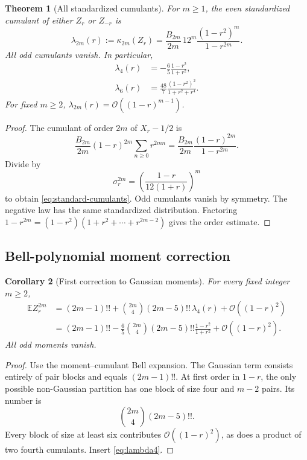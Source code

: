 \documentclass[11pt]{article}
\newtheorem{theorem}{Theorem}[section]
\newtheorem{corollary}[theorem]{Corollary}
\theoremstyle{definition}
\newcommand{\E}{\mathbb E}
\newcommand{\cump}{\kappa}
\newcommand{\BigO}{\mathcal O}
\begin{document}
\begin{theorem}[All standardized cumulants]\label{thm:standard-cumulants}
For \(m\ge1\), the even standardized cumulant of either \(Z_r\) or \(Z_{-r}\) is
\begin{equation}
 \boxed{
 \lambda_{2m}(r):=\cump_{2m}(Z_r)
 =\frac{B_{2m}}{2m}\,12^m
 \frac{(1-r^2)^m}{1-r^{2m}}.}                             \label{eq:standard-cumulants}
\end{equation}
All odd cumulants vanish.  In particular,
\begin{align}
 \lambda_4(r)&=-\frac65\frac{1-r^2}{1+r^2},              \label{eq:lambda4}\\
 \lambda_6(r)&=\frac{48}{7}
 \frac{(1-r^2)^2}{1+r^2+r^4}.                            \label{eq:lambda6}
\end{align}
For fixed \(m\ge2\), \(\lambda_{2m}(r)=\BigO((1-r)^{m-1})\).
\end{theorem}

\begin{proof}
The cumulant of order \(2m\) of \(X_r-1/2\) is
\[
 \frac{B_{2m}}{2m}(1-r)^{2m}\sum_{n\ge0}r^{2mn}
 =\frac{B_{2m}}{2m}\frac{(1-r)^{2m}}{1-r^{2m}}.
\]
Divide by
\[
 \sigma_r^{2m}=\left(\frac{1-r}{12(1+r)}\right)^m
\]
to obtain \cref{eq:standard-cumulants}.  Odd cumulants vanish by symmetry.  The
negative law has the same standardized distribution.  Factoring
\(1-r^{2m}=(1-r^2)(1+r^2+\cdots+r^{2m-2})\) gives the order estimate.
\end{proof}

\subsection{Bell-polynomial moment correction}

\begin{corollary}[First correction to Gaussian moments]\label{cor:moment-correction}
For every fixed integer \(m\ge2\),
\begin{align}
 \E Z_r^{2m}
 &=(2m-1)!!
 +\binom{2m}{4}(2m-5)!!\,\lambda_4(r)
 +\BigO((1-r)^2)                                          \label{eq:moment-correction-1}\\
 &=(2m-1)!!
 -\frac65\binom{2m}{4}(2m-5)!!
  \frac{1-r^2}{1+r^2}
 +\BigO((1-r)^2).                                         \label{eq:moment-correction-2}
\end{align}
All odd moments vanish.
\end{corollary}

\begin{proof}
Use the moment--cumulant Bell expansion.  The Gaussian term consists entirely of pair
blocks and equals \((2m-1)!!\).  At first order in \(1-r\), the only possible
non-Gaussian partition has one block of size four and \(m-2\) pairs.  Its number is
\[
 \binom{2m}{4}(2m-5)!!.
\]
Every block of size at least six contributes \(\BigO((1-r)^2)\), as does a product of
two fourth cumulants.  Insert \cref{eq:lambda4}.
\end{proof}
\end{document}
